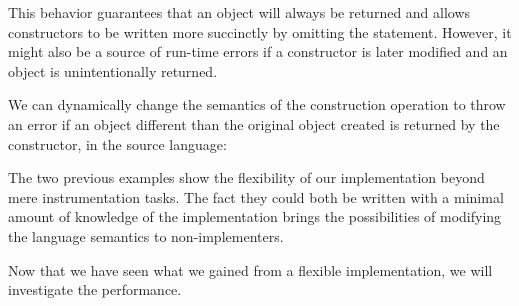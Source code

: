 This behavior guarantees that an object will always be returned and allows
constructors to be written more succinctly by omitting the 
statement. However, it might also be a source of run-time errors if a
constructor is later modified and an object is unintentionally returned.

We can dynamically change the semantics of the construction operation to throw
an error if an object different than the original object created is returned by
the constructor, in the source language:


The two previous examples show the flexibility of our implementation beyond mere
instrumentation tasks. The fact they could both be written with a minimal
amount of knowledge of the implementation brings the possibilities of modifying
the language semantics to non-implementers.

Now that we have seen what we gained from a flexible implementation, we will
investigate the performance.
